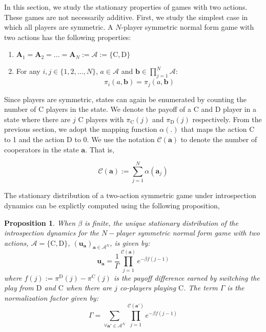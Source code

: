 \documentclass[11pt]{article}
\theoremstyle{plainCl1}
\newtheorem{Prop}{Proposition}
\theoremstyle{plainCl2}
\newcommand{\A}{\mathbf{A}}
\newcommand{\abf}{\mathbf{a}}
\newcommand{\bbf}{\mathbf{b}}
\newcommand{\ubf}{\mathbf{u}}
\newcommand{\C}{\mathrm{C}}
\newcommand{\D}{\mathrm{D}}
\begin{document}
In this section, we study the stationary properties of games with two actions. These games are not necessarily additive. First, we study the simplest case in which all players are symmetric. A $N$-player symmetric normal form game with two actions has the following properties:

\begin{enumerate}
\item  $\A_1 = \A_2 = ... = \A_N := \mathcal{A} := \{\C,\D\}$
\item For any $i,j \in \{1,2,...,N\}$, $a \in \mathcal{A}$ and $\bbf \in \displaystyle \prod_{j=1}^{N} \mathcal{A}$:
\begin{equation}
\pi_i(a,\bbf) = \pi_j(a,\bbf)
\end{equation} 
\end{enumerate}

\noindent Since players are symmetric, states can again be enumerated by counting the number of $\C$ players in the state. We denote the payoff of a $\C$ and $\D$ player in a state where there are $j$ $\C$ players with $\pi_\C(j)$ and $\pi_\D(j)$ respectively. From the previous section, we adopt the mapping function $\alpha(.)$ that maps the action $\C$ to 1 and the action $\D$ to 0. We use the notation $\mathcal{C}(\abf)$ to denote the number of cooperators in the state $\abf$. That is,

\begin{equation}
\mathcal{C}(\abf) := \sum_{j=1}^N \alpha(\abf_j)
\end{equation}

\noindent 
The stationary distribution of a two-action symmetric game under introspection dynamics can be explictly computed using the following proposition, 

\begin{Prop}
\label{Prop:Symmetric-2-strategies-state}
When $\beta$ is finite, the unique stationary distribution of the introspection dynamics for the $N-$player symmetric normal form game with two actions, $\mathcal{A} = \{\C, \D \}$, $(\ubf_{\abf})_{\abf \in \mathcal{A}^N}$, is given by:
\begin{equation}
\label{Eq:stationary-dist-symm-2-stgs-state}
\ubf_\abf = \frac{1}{\Gamma} \displaystyle \prod_{j=1}^{\mathcal{C}(\abf)} \displaystyle e^{-\beta f(j-1)}
\end{equation}
where $f(j) := \pi^\D(j) - \pi^\C(j)$ is the payoff difference earned by switching the play from $\D$ and $\C$ when there are $j$ co-players playing $\C$. The term $\Gamma$ is the normalization factor given by:
\begin{equation}
\label{Eq:stationary-dist-normalization-symm-2-stgs-state}
\Gamma = \displaystyle \sum_{\forall \abf' \in \mathcal{A}^N} \prod_{j = 1}^{\mathcal{C}(\abf')} \displaystyle e^{-\beta f(j-1)}
\end{equation}
\end{Prop}
\end{document}
